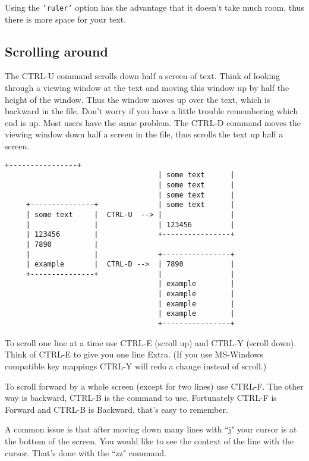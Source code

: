 Using the \texttt{'ruler'} option has the advantage that it doesn't take much room,
thus there is more space for your text.

\subsection{Scrolling around}

The CTRL-U command scrolls down half a screen of text.
Think of looking through a viewing window at the text and moving this window up by half the height of the window.
Thus the window moves up over the text, which is backward in the file.
Don't worry if you have a little trouble remembering which end is up.
Most users have the same problem.
The CTRL-D command moves the viewing window down half a screen in the file, thus scrolls the text up half a screen.

\begin{Verbatim}[samepage=true]
                                    +----------------+
                                    | some text      |
                                    | some text      |
                                    | some text      |
     +---------------+              | some text      |
     | some text     |  CTRL-U  --> |                |
     |               |              | 123456         |
     | 123456        |              +----------------+
     | 7890          |
     |               |              +----------------+
     | example       |  CTRL-D -->  | 7890           |
     +---------------+              |                |
                                    | example        |
                                    | example        |
                                    | example        |
                                    | example        |
                                    +----------------+
\end{Verbatim}
 
To scroll one line at a time use CTRL-E (scroll up) and CTRL-Y (scroll down).
Think of CTRL-E to give you one line Extra.
(If you use MS-Windows compatible key mappings CTRL-Y will redo a change instead of scroll.)

To scroll forward by a whole screen (except for two lines) use CTRL-F.
The other way is backward, CTRL-B is the command to use.
Fortunately CTRL-F is Forward and CTRL-B is Backward, that's easy to remember.

A common issue is that after moving down many lines with ``j" your cursor is at the bottom of the screen.
You would like to see the context of the line with the cursor.
That's done with the ``zz" command.

